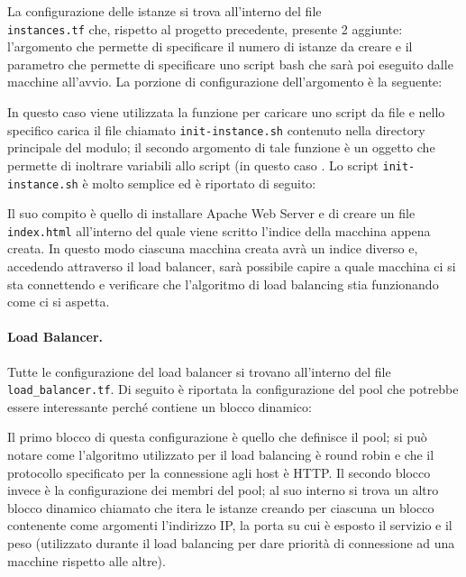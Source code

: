 La configurazione delle istanze si trova all'interno del file \\
\verb|instances.tf| che, rispetto al progetto precedente, presente 2 aggiunte: l'argomento  che permette di specificare il numero di istanze da creare e il parametro  che permette di specificare uno script bash che sarà poi eseguito dalle macchine all'avvio. La porzione di configurazione dell'argomento  è la seguente:

\noindent
In questo caso viene utilizzata la funzione  per caricare uno script da file e nello specifico carica il file chiamato \verb|init-instance.sh| contenuto nella directory principale del modulo; il secondo argomento di tale funzione è un oggetto che permette di inoltrare variabili allo script (in questo caso . Lo script \verb|init-instance.sh| è molto semplice ed è riportato di seguito:

\noindent
Il suo compito è quello di installare Apache Web Server e di creare un file \verb|index.html| all'interno del quale viene scritto l'indice della macchina appena creata. In questo modo ciascuna macchina creata avrà un indice diverso e, accedendo attraverso il load balancer, sarà possibile capire a quale macchina ci si sta connettendo e verificare che l'algoritmo di load balancing stia funzionando come ci si aspetta.

\paragraph{Load Balancer.}

Tutte le configurazione del load balancer si trovano all'interno del file \verb|load_balancer.tf|. Di seguito è riportata la configurazione del pool che potrebbe essere interessante perché contiene un blocco dinamico:

\noindent
Il primo blocco di questa configurazione è quello che definisce il pool; si può notare come l'algoritmo utilizzato per il load balancing è round robin e che il protocollo specificato per la connessione agli host è HTTP. Il secondo blocco invece è la configurazione dei membri del pool; al suo interno si trova un altro blocco dinamico chiamato  che itera le istanze creando per ciascuna un blocco contenente come argomenti l'indirizzo IP, la porta su cui è esposto il servizio e il peso (utilizzato durante il load balancing per dare priorità di connessione ad una macchine rispetto alle altre).

